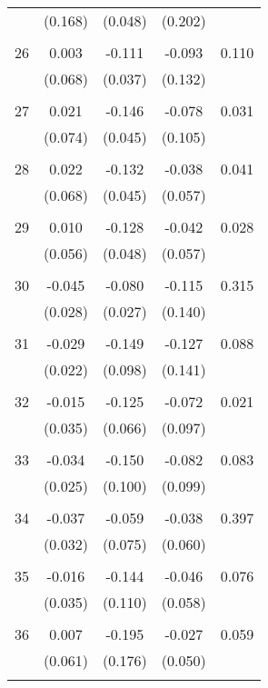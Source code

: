 \begin{tabular}{l*{1}{cccc}}
          & (0.168) & (0.048) & (0.202) & \\
 & & & &\\
  26       & 0.003 & -0.111 & -0.093 & 0.110 \\
          & (0.068) & (0.037) & (0.132) & \\
 & & & &\\
  27       & 0.021 & -0.146 & -0.078 & 0.031 \\
          & (0.074) & (0.045) & (0.105) & \\
 & & & &\\
  28       & 0.022 & -0.132 & -0.038 & 0.041 \\
          & (0.068) & (0.045) & (0.057) & \\
 & & & &\\
  29       & 0.010 & -0.128 & -0.042 & 0.028 \\
          & (0.056) & (0.048) & (0.057) & \\
 & & & &\\
  30       & -0.045 & -0.080 & -0.115 & 0.315 \\
          & (0.028) & (0.027) & (0.140) & \\
 & & & &\\
  31       & -0.029 & -0.149 & -0.127 & 0.088 \\
          & (0.022) & (0.098) & (0.141) & \\
 & & & &\\
  32       & -0.015 & -0.125 & -0.072 & 0.021 \\
          & (0.035) & (0.066) & (0.097) & \\
 & & & &\\
  33       & -0.034 & -0.150 & -0.082 & 0.083 \\
          & (0.025) & (0.100) & (0.099) & \\
 & & & &\\
  34       & -0.037 & -0.059 & -0.038 & 0.397 \\
          & (0.032) & (0.075) & (0.060) & \\
 & & & &\\
  35       & -0.016 & -0.144 & -0.046 & 0.076 \\
          & (0.035) & (0.110) & (0.058) & \\
 & & & &\\
  36       & 0.007 & -0.195 & -0.027 & 0.059 \\
          & (0.061) & (0.176) & (0.050) & \\
 & & & &\\

\end{tabular}
